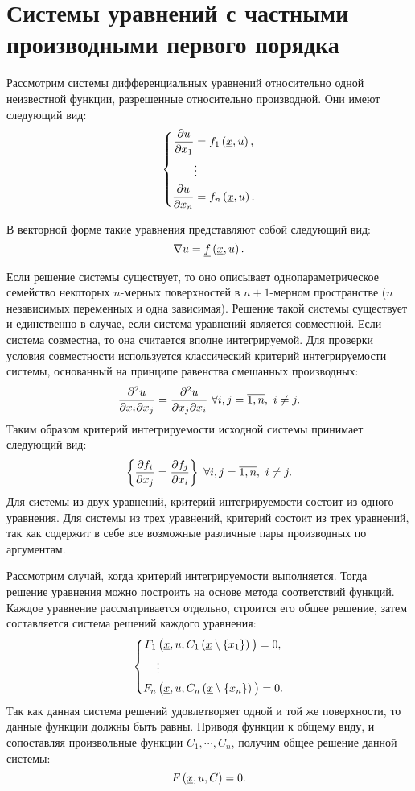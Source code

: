 \section{Системы уравнений с частными производными первого порядка}

	Рассмотрим системы дифференциальных уравнений относительно одной неизвестной функции, разрешенные относительно производной. Они имеют следующий вид:
	\[ \left\lbrace \begin{split} 
		\dfrac{\partial u}{\partial x_1} &= f_1 \left( \underline{x}, u \right), \\
		&\vdots \\
		\dfrac{\partial u}{\partial x_n} &= f_n \left( \underline{x}, u \right).
	\end{split} \right. \]

	В векторной форме такие уравнения представляют собой следующий вид:
	\[ \nabla{u} = \underline{f}\left( \underline{x}, u \right). \]

	Если решение системы существует, то оно описывает однопараметрическое семейство некоторых $n$-мерных поверхностей в $n+1$-мерном пространстве ($n$ независимых переменных и одна зависимая). Решение такой системы существует и единственно в случае, если система уравнений является совместной. Если система совместна, то она считается вполне интегрируемой. Для проверки условия совместности используется классический критерий интегрируемости системы, основанный на принципе равенства смешанных производных:
	\[ \dfrac{\partial^2 u}{\partial x_i \partial x_j} = \dfrac{\partial^2 u}{\partial x_j \partial x_i} ~ \forall i, j = \overline{1, n}, ~ i \neq j. \] 
	Таким образом критерий интегрируемости исходной системы принимает следующий вид:
	\[ \left\lbrace  \dfrac{\partial f_i}{\partial x_j} = \dfrac{\partial f_j}{\partial x_i}  \right\rbrace ~ \forall i, j = \overline{1, n}, ~ i \neq j. \]
	Для системы из двух уравнений, критерий интегрируемости состоит из одного уравнения. Для системы из трех уравнений, критерий состоит из трех уравнений, так как содержит в себе все возможные различные пары производных по аргументам.

	Рассмотрим случай, когда критерий интегрируемости выполняется. Тогда решение уравнения можно построить на основе метода соответствий функций. Каждое уравнение рассматривается отдельно, строится его общее решение, затем составляется система решений каждого уравнения:
	\[ \left\lbrace \begin{split}
		F_1 & \pares{\vec{x}, u, C_1\pares{\vec{x} \setminus \bracs{x_1}}\phn} = 0, \\
		& \vdots \\
		F_n & \pares{\vec{x}, u, C_n\pares{\vec{x} \setminus \bracs{x_n}}\phn} = 0. \\
	\end{split} \right. \]
	Так как данная система решений удовлетворяет одной и той же поверхности, то данные функции должны быть равны. Приводя функции к общему виду, и сопоставляя произвольные функции $C_1, \cdots, C_n$, получим общее решение данной системы:
	\[ F\left( \underline{x}, u, C \right) = 0. \]

